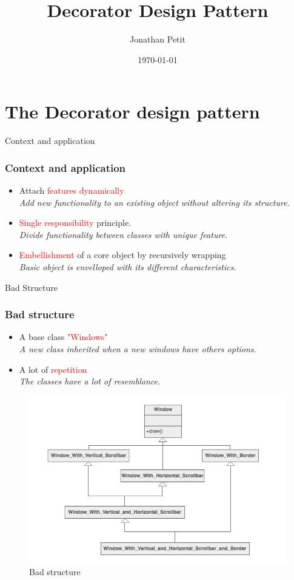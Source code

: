 \documentclass{beamer}
\title{Decorator Design Pattern}
\date{\today}
\author{Jonathan Petit}
\institute{ECAM}
\begin{document}
  \maketitle

\section{The Decorator design pattern}

  \begin{frame}{Context and application}
    \frametitle{Context and application}
    \begin{itemize}
      \item Attach \textcolor{red}{features dynamically} \\
      \textit{Add new functionality to an existing object without altering its structure.}
      \item \textcolor{red}{Single responsibility} principle. \\
      \textit{Divide functionality between classes with unique feature.}
      \item \textcolor{red}{Embellishment} of a core object by recursively wrapping \\
      \textit{Basic object is envelloped with its different characteristics.}
    \end{itemize}
  \end{frame}

  \begin{frame}{Bad Structure}
    \frametitle{Bad structure}
    \begin{itemize}
      \item A base class \textcolor{red}{"Windows"} \\
      \textit{A new class inherited when a new windows have others options.}
      \item A lot of \textcolor{red}{repetition} \\
      \textit{The classes have a lot of resemblance.}
    \end{itemize}
    \begin{figure}[!b]
      \centering
      \includegraphics[scale=0.25]{bad}
      \caption{Bad structure}
    \end{figure}
  \end{frame}
\end{document}
